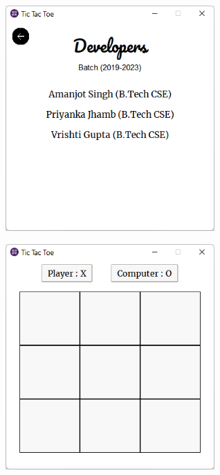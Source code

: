 \vspace{15pt}

\includegraphics[width=8cm, height=9cm]{figures/developers_page.png}
\hfill
\includegraphics[width=8cm, height=9cm]{figures/GameBoard_page.png}

\vspace{10pt}

